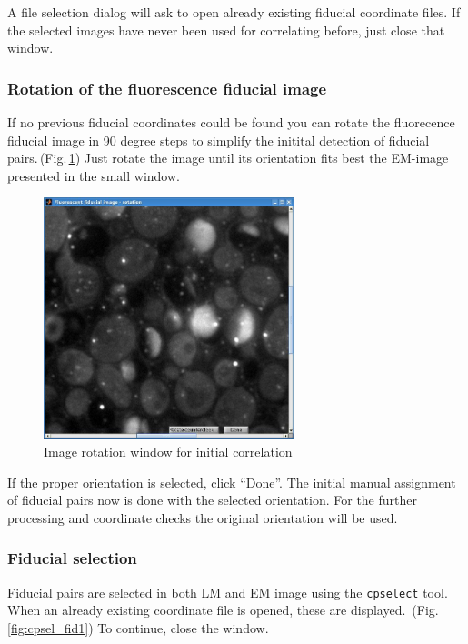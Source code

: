 \documentclass[10pt,a4paper,onepage,DIV12]{scrartcl}
\begin{document}
A file selection dialog will ask to open already existing fiducial coordinate files. If the selected images have never been used for correlating before, just close that window.\\

\subsubsection{Rotation of the fluorescence fiducial image}
\label{sec:rotation}

If no previous fiducial coordinates could be found you can rotate the fluorecence fiducial image in 90 degree steps to simplify the initital detection of fiducial pairs.\,(Fig.\,\ref{fig:rotate}) Just rotate the image until its orientation fits best the EM-image presented in the small window.

\begin{figure}
 \centering
 \includegraphics[width=0.65\textwidth]{images/rotate.jpg}
 \caption{Image rotation window for initial correlation}
 \label{fig:rotate}
\end{figure}

If the proper orientation is selected, click ``Done''. The initial manual assignment of fiducial pairs now is done with the selected orientation. For the further processing and coordinate checks the original orientation will be used.


\subsubsection{Fiducial selection}
\label{sec:fiducials}

Fiducial pairs are selected in both LM and EM image using the \texttt{cpselect} tool. When an already existing coordinate file is opened, these are displayed.\, (Fig.\,\ref{fig:cpsel_fid1}) To continue, close the window.
\end{document}

